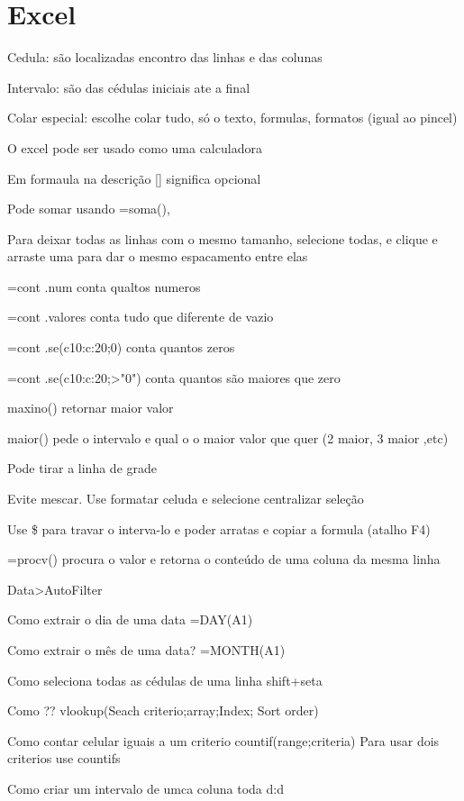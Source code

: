 
\chapter{Excel} 
Cedula: são localizadas encontro das linhas e das colunas

Intervalo: são das cédulas iniciais ate a final

Colar especial: escolhe colar tudo, só o texto, formulas, formatos (igual ao pincel)

O excel pode ser usado como uma calculadora

Em formaula na descrição [] significa opcional

Pode somar usando =soma(), 

Para deixar todas as linhas com o mesmo tamanho, selecione todas, e clique e arraste uma para dar o mesmo espacamento entre elas

=cont	.num conta qualtos numeros

=cont	.valores conta tudo que diferente de vazio

=cont	.se(c10:c:20;0) conta quantos zeros

=cont	.se(c10:c:20;>"0") conta quantos são maiores que zero

maxino() retornar maior valor

maior() pede o intervalo e qual o o maior valor que quer (2 maior, 3 maior ,etc)
	
Pode tirar a linha de grade 

Evite mescar. Use formatar celuda e selecione centralizar seleção



Use \$ para travar o interva-lo e poder arratas e copiar a formula (atalho F4)

=procv() procura o valor e retorna o conteúdo de uma coluna da mesma linha


Data>AutoFilter

Como extrair o dia de uma data
=DAY(A1)

Como extrair o mês de uma data?
=MONTH(A1)

Como seleciona todas as cédulas de uma linha
shift+seta

Como ??
vlookup(Seach criterio;array;Index; Sort order)

Como contar celular iguais a um criterio
countif(range;criteria)
Para usar dois criterios use countifs

Como criar um intervalo de umca coluna toda
d:d

